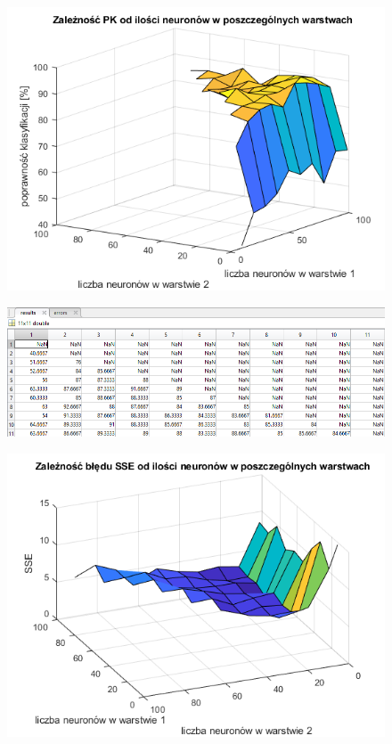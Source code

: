 \documentclass[a4paper, 12pt]{report}
\begin{document}
\begin{figure}[hbt!]
\includegraphics[width=14cm]{lr5 pk}
\centering
\end{figure}
\begin{figure}[hbt!]

\includegraphics[width=14cm]{lr5 pk dane}
\centering
\end{figure}

\begin{figure}[hbt!]
\includegraphics[width=14cm]{lr5 sse}
\centering
\end{figure}
\end{document}
